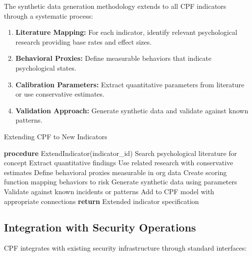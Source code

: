 \documentclass[10pt,twocolumn]{IEEEtran}
\begin{document}
The synthetic data generation methodology extends to all CPF indicators through a systematic process:

\begin{enumerate}
\item \textbf{Literature Mapping:} For each indicator, identify relevant psychological research providing base rates and effect sizes.
\item \textbf{Behavioral Proxies:} Define measurable behaviors that indicate psychological states.
\item \textbf{Calibration Parameters:} Extract quantitative parameters from literature or use conservative estimates.
\item \textbf{Validation Approach:} Generate synthetic data and validate against known patterns.
\end{enumerate}

\begin{algorithm}
\caption{Extending CPF to New Indicators}
\label{alg:extend}
\begin{algorithmic}[1]
\STATE \textbf{procedure} ExtendIndicator(indicator\_id)
\STATE Search psychological literature for concept
\STATE Extract quantitative findings
    \STATE Use related research with conservative estimates
\ENDIF
\STATE Define behavioral proxies measurable in org data
\STATE Create scoring function mapping behaviors to risk
\STATE Generate synthetic data using parameters
\STATE Validate against known incidents or patterns
\STATE Add to CPF model with appropriate connections
\STATE \textbf{return} Extended indicator specification
\end{algorithmic}
\end{algorithm}

\subsection{Integration with Security Operations}

CPF integrates with existing security infrastructure through standard interfaces:
\end{document}

